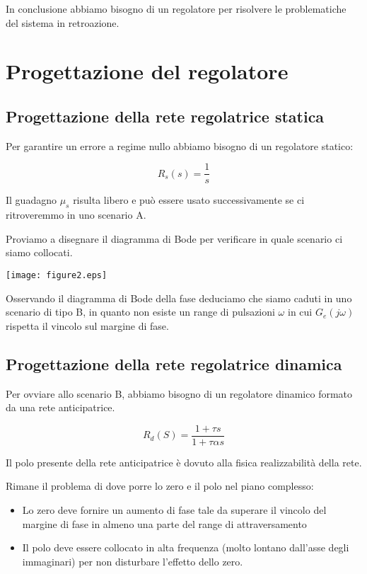 \documentclass{article}
\begin{document}
In conclusione abbiamo bisogno di un regolatore per risolvere le problematiche del sistema in retroazione.

\section{Progettazione del regolatore}

\subsection{Progettazione della rete regolatrice statica}

Per garantire un errore a regime nullo abbiamo bisogno di un regolatore statico:

$$
R_s(s)=\frac{1}{s}
$$

Il guadagno $\mu_s$ risulta libero e può essere usato successivamente se ci ritroveremmo in uno scenario A.

Proviamo a disegnare il diagramma di Bode per verificare in quale scenario ci siamo collocati.

\begin{center}
    \texttt{[image: figure2.eps]}
\end{center}

Osservando il diagramma di Bode della fase deduciamo che siamo caduti in uno scenario di tipo B, in quanto non esiste un range di pulsazioni $\omega$ in cui $G_e(j\omega)$ rispetta il vincolo sul margine di fase.

\subsection{Progettazione della rete regolatrice dinamica}

Per ovviare allo scenario B, abbiamo bisogno di un regolatore dinamico formato da una rete anticipatrice.

$$
R_d(S)=\frac{1+\tau s}{1+\tau \alpha s}
$$

Il polo presente della rete anticipatrice è dovuto alla fisica realizzabilità della rete.

Rimane il problema di dove porre lo zero e il polo nel piano complesso:
\begin{itemize}
    \item Lo zero deve fornire un aumento di fase tale da superare il vincolo del margine di fase in almeno una parte del range di attraversamento
    \item Il polo deve essere collocato in alta frequenza (molto lontano dall'asse degli immaginari) per non disturbare l'effetto dello zero.
\end{itemize}
\end{document}

